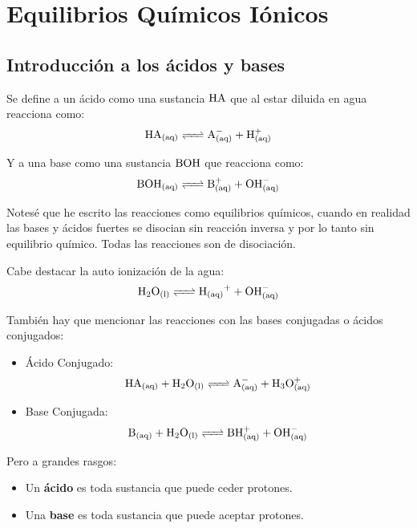 \documentclass[arial,a4paper,print]{article}
\begin{document}
\section{Equilibrios Químicos Iónicos}
\subsection{Introducción a los ácidos y bases}
Se define a un ácido como una sustancia $\ce{HA}$ que al estar diluida en agua reacciona como:
\begin{equation*}
	\ce{HA_{(aq)} <=> A^-_{(aq)} + H^+_{(aq)}}
\end{equation*}

Y a una base como una sustancia $\ce{BOH}$ que reacciona como:
\begin{equation*}
	\ce{BOH_{(aq)} <=> B^+_{(aq)} + OH^-_{(aq)}}
\end{equation*}

Notesé que he escrito las reacciones como equilibrios químicos, cuando en realidad las bases y ácidos fuertes se disocian sin reacción inversa y por lo tanto sin equilibrio químico. Todas las reacciones son de disociación. 

Cabe destacar la auto ionización de la agua:
\begin{equation*}
	\ce{H2O_{(l)} <=> H_{(aq)}^+ + OH^-_{(aq)}}
\end{equation*}

\pagebreak
También hay que mencionar las reacciones con las bases conjugadas o ácidos conjugados: 

\begin{itemize}
\item Ácido Conjugado:
\begin{equation*}
	\ce{HA_{(aq)} + H2O_{(l)} <=> A^-_{(aq)} + H3O^{+}_{(aq)}}
\end{equation*}

\item Base Conjugada:
\begin{equation*}
	\ce{B_{(aq)} + H2O_{(l)} <=> BH^+_{(aq)} + OH^-_{(aq)}}
\end{equation*}
\end{itemize}

Pero a grandes rasgos:
\begin{itemize}
\item Un \textbf{ácido} es toda sustancia que puede ceder protones.
\item Una \textbf{base} es toda sustancia que puede aceptar protones. 
\end{itemize}
\end{document}
